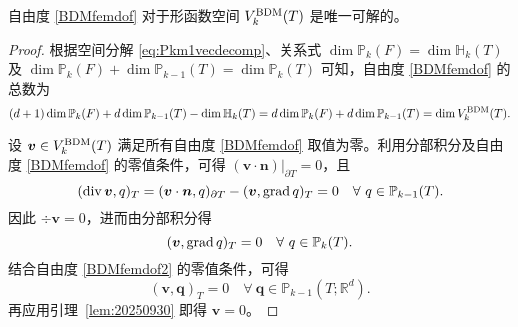 \begin{lemma}\label{lem:unisovlenBDMfem}
自由度 \eqref{BDMfemdof} 对于形函数空间 $V_k^{\rm BDM}(T)$ 是唯一可解的。
\end{lemma}
\begin{proof}
根据空间分解 \eqref{eq:Pkm1vecdecomp}、关系式 $\dim\mathbb P_{k}(F)=\dim \mathbb H_{k}(T)$ 及 $\dim\mathbb P_{k}(F)+\dim\mathbb P_{k-1}(T)=\dim\mathbb P_{k}(T)$ 可知，自由度 \eqref{BDMfemdof} 的总数为
\begin{equation*}
(d+1)\dim\mathbb P_{k}(F)+d\dim\mathbb P_{k-1}(T) - \dim\mathbb H_{k}(T) = d\dim\mathbb P_{k}(F)+d\dim\mathbb P_{k-1}(T) = \dim V_k^{\rm BDM}(T).
\end{equation*}

设 $\boldsymbol{v}\in V_k^{\rm BDM}(T)$ 满足所有自由度 \eqref{BDMfemdof} 取值为零。利用分部积分及自由度 \eqref{BDMfemdof} 的零值条件，可得 $(\boldsymbol{v}\cdot\boldsymbol{n})|_{\partial T}=0$，且
\begin{equation*}
(\operatorname{div}\boldsymbol{v}, q)_T=(\boldsymbol{v}\cdot\boldsymbol{n},q)_{\partial T} - (\boldsymbol{v},\operatorname{grad} q)_T=0\quad\forall~q\in \mathbb P_{k-1}(T).
\end{equation*}
因此 $\div\boldsymbol{v}=0$，进而由分部积分得
\begin{equation*}
(\boldsymbol{v},\operatorname{grad} q)_T=0\quad\forall~q\in \mathbb P_{k}(T).
\end{equation*}
结合自由度 \eqref{BDMfemdof2} 的零值条件，可得
\begin{equation*}
(\boldsymbol v, \boldsymbol q)_T =0 \quad \forall~\boldsymbol q\in\mathbb P_{k-1}(T; \mathbb R^d).
\end{equation*}
再应用引理~\ref{lem:20250930} 即得 $\boldsymbol{v}=0$。
\end{proof}


